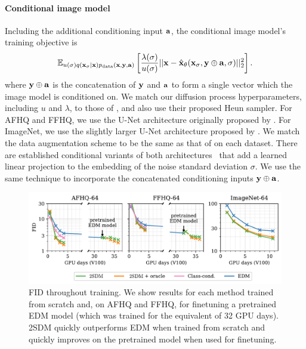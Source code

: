 \paragraph{Conditional image model}
Including the additional conditioning input ${\mathbf{a}}$, the conditional image model's training objective is
\begin{equation}
\label{eq:conditional-image-model-objective}
    \mathbb{E}_{u(\sigma)q({\mathbf{x}}_\sigma|{\mathbf{x}})p_{\rm{data}}({\mathbf{x}},{\mathbf{y}},{\mathbf{a}})} \left[ \frac{\lambda(\sigma)}{u(\sigma)} \lvert\lvert {\mathbf{x}} - \hat{{\mathbf{x}}}_\theta({\mathbf{x}}_\sigma, {\mathbf{y}} \oplus {\mathbf{a}}, \sigma) \rvert\rvert_2^2 \right].
\end{equation}
where ${\mathbf{y}} \oplus {\mathbf{a}}$ is the concatenation of ${\mathbf{y}}$ and ${\mathbf{a}}$ to form a single vector which the image model is conditioned on. We match our diffusion process hyperparameters, including $u$ and $\lambda$, to those of \citet{karras2022elucidating}, and also use their proposed Heun sampler.  For AFHQ and FFHQ, we use the U-Net architecture originally proposed by \citet{song2020score}. For ImageNet, we use the slightly larger U-Net architecture proposed by \citet{dhariwal2021diffusion}. We match the data augmentation scheme to be the same as that of \citet{karras2022elucidating} on each dataset. There are established conditional variants of both architectures~\citep{dhariwal2021diffusion,karras2022elucidating} that add a learned linear projection to the embedding of the noise standard deviation $\sigma$.  We use the same technique to incorporate the concatenated conditioning inputs ${\mathbf{y}}\oplus{\mathbf{a}}$.

\begin{figure}[t]
    \centering
    \includegraphics[width=\textwidth]{figs/2sdm/cond-results-1.pdf}
    \caption{FID throughout training. We show results for each method trained from scratch and, on AFHQ and FFHQ, for finetuning a pretrained EDM model (which was trained for the equivalent of 32 GPU days). 2SDM quickly outperforms EDM when trained from scratch and quickly improves on the pretrained model when used for finetuning.}
    \label{fig:fid_vs_training}
\end{figure}

